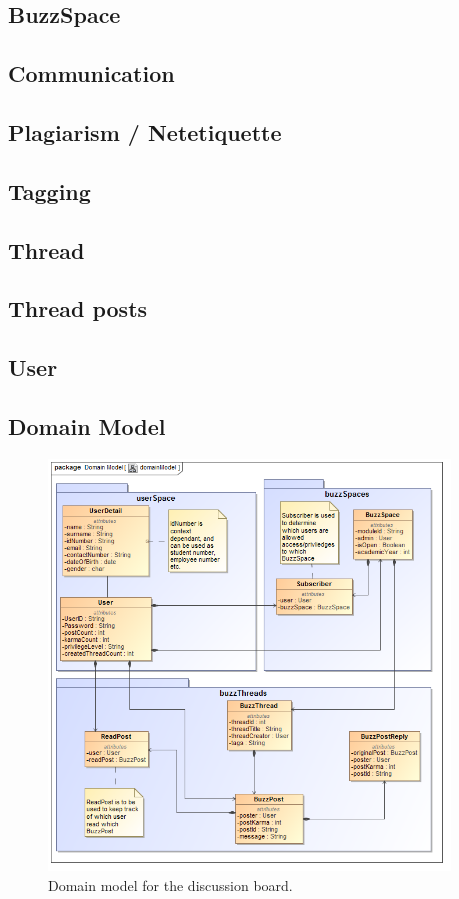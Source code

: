 \documentclass [a4paper,12pt] {article}
\begin{document}
		\subsection*{BuzzSpace}
		\subsection*{Communication}
		\subsection*{Plagiarism / Netetiquette}
		\subsection*{Tagging}
		\subsection*{Thread}
		\subsection*{Thread posts}
		\subsection*{User}

\pagebreak
	\subsection{Domain Model}
		\begin{figure}[h!]
			\centering
			\includegraphics[width=0.95\textwidth]{domainModel.png}
			\caption{Domain model for the discussion board.}
		\end{figure}
\end{document}
